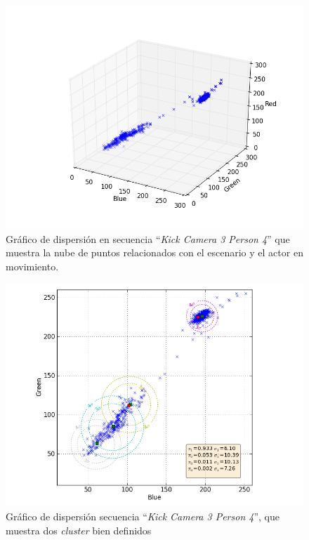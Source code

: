 \begin{figure}[h!]
  \centering
      \includegraphics[scale=0.75]{img/ch3/scatter_pt_340_160_3D_Blue_Green_Red}
  \caption[Gráfico dispersión 3D secuencia completa ``\textit{Kick Camera 3 Person 4}'']{Gráfico de dispersión en secuencia ``\textit{Kick Camera 3 Person 4}'' que muestra la nube de puntos relacionados con el escenario y el actor en movimiento.}
\label{scatter_3D}
\end{figure}

\begin{figure}[h!]
  \centering
      \includegraphics[scale=0.75]{img/ch3/scatter_pt_340_160_isotropic_Blue_Green}
  \caption[Gráfico dispersión 2D secuencia completa ``\textit{Kick Camera 3 Person 4}'']{Gráfico de dispersión secuencia ``\textit{Kick Camera 3 Person 4}'', que muestra dos \textit{cluster} bien definidos}
\label{scatter_2D}
\end{figure}

